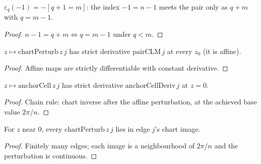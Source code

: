 \begin{lemma}
  \label{lem:pair_sign_neg_one}
  $\varepsilon_q(-1) = -[q + 1 = m]$: the index $-1 = n - 1$ meets the pair
  only as $q + m$ with $q = m - 1$.
\end{lemma}
\begin{proof}

\leanok
  $n - 1 = q + m \iff q = m - 1$ under $q < m$.
\end{proof}

\begin{lemma}
  \label{lem:has_strict_fderiv_at_chart_perturb}
  $z \mapsto \mathrm{chartPerturb}\,z\,j$ has strict derivative
  $\mathrm{pairCLM}\,j$ at every $z_0$ (it is affine).
\end{lemma}
\begin{proof}

\leanok
  Affine maps are strictly differentiable with constant derivative.
\end{proof}

\begin{lemma}
  \label{lem:has_strict_fderiv_at_anchor_cell}
  $z \mapsto \mathrm{anchorCell}\,z\,j$ has strict derivative
  $\mathrm{anchorCellDeriv}\,j$ at $z = 0$.
\end{lemma}
\begin{proof}

\leanok
  Chain rule: chart inverse after the affine perturbation, at the achieved
  base value $2\pi/n$.
\end{proof}

\begin{lemma}
  \label{lem:eventually_chart_perturb_mem}
  For $z$ near $0$, every $\mathrm{chartPerturb}\,z\,j$ lies in edge $j$'s
  chart image.
\end{lemma}
\begin{proof}

\leanok
  Finitely many edges; each image is a neighbourhood of $2\pi/n$ and the
  perturbation is continuous.
\end{proof}

